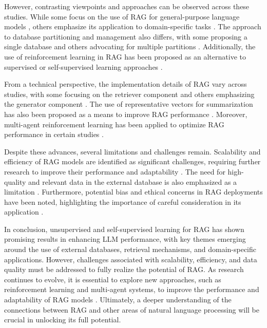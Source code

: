 \documentclass[conference]{IEEEtran}
\begin{document}
However, contrasting viewpoints and approaches can be observed across these studies. While some focus on the use of RAG for general-purpose language models \cite{b1, b3, b4}, others emphasize its application to domain-specific tasks \cite{b2}. The approach to database partitioning and management also differs, with some proposing a single database \cite{b1, b2, b3, b4} and others advocating for multiple partitions \cite{b5}. Additionally, the use of reinforcement learning in RAG has been proposed as an alternative to supervised or self-supervised learning approaches \cite{b5}.

From a technical perspective, the implementation details of RAG vary across studies, with some focusing on the retriever component \cite{b1, b2, b3, b4} and others emphasizing the generator component \cite{b5}. The use of representative vectors for summarization has also been proposed as a means to improve RAG performance \cite{b2}. Moreover, multi-agent reinforcement learning has been applied to optimize RAG performance in certain studies \cite{b5}.

Despite these advances, several limitations and challenges remain. Scalability and efficiency of RAG models are identified as significant challenges, requiring further research to improve their performance and adaptability \cite{b1, b2, b3, b4}. The need for high-quality and relevant data in the external database is also emphasized as a limitation \cite{b1, b2, b3, b4}. Furthermore, potential bias and ethical concerns in RAG deployments have been noted, highlighting the importance of careful consideration in its application \cite{b1}.

In conclusion, unsupervised and self-supervised learning for RAG has shown promising results in enhancing LLM performance, with key themes emerging around the use of external databases, retrieval mechanisms, and domain-specific applications. However, challenges associated with scalability, efficiency, and data quality must be addressed to fully realize the potential of RAG. As research continues to evolve, it is essential to explore new approaches, such as reinforcement learning and multi-agent systems, to improve the performance and adaptability of RAG models \cite{b5}. Ultimately, a deeper understanding of the connections between RAG and other areas of natural language processing will be crucial in unlocking its full potential.
\end{document}
